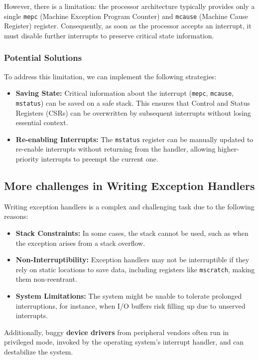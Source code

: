 However, there is a limitation: the processor architecture typically provides only a single \texttt{mepc} (Machine Exception Program Counter) and \texttt{mcause} (Machine Cause Register) register. Consequently, as soon as the processor accepts an interrupt, it must disable further interrupts to preserve critical state information.
\subsubsection*{Potential Solutions}
To address this limitation, we can implement the following strategies:
\begin{itemize}
    \item \textbf{Saving State:} Critical information about the interrupt (\texttt{mepc}, \texttt{mcause}, \texttt{mstatus}) can be saved on a safe stack. This ensures that Control and Status Registers (CSRs) can be overwritten by subsequent interrupts without losing essential context.
    \item \textbf{Re-enabling Interrupts:} The \texttt{mstatus} register can be manually updated to re-enable interrupts without returning from the handler, allowing higher-priority interrupts to preempt the current one.
\end{itemize}

\subsection{More challenges in Writing Exception Handlers}

Writing exception handlers is a complex and challenging task due to the following reasons:

\begin{itemize}
    \item \textbf{Stack Constraints:} In some cases, the stack cannot be used, such as when the exception arises from a stack overflow.
    \item \textbf{Non-Interruptibility:} Exception handlers may not be interruptible if they rely on static locations to save data, including registers like \texttt{mscratch}, making them non-reentrant.
    \item \textbf{System Limitations:} The system might be unable to tolerate prolonged interruptions, for instance, when I/O buffers risk filling up due to unserved interrupts.
\end{itemize}

Additionally, buggy \textbf{device drivers} from peripheral vendors often run in privileged mode, invoked by the operating system's interrupt handler, and can destabilize the system.

